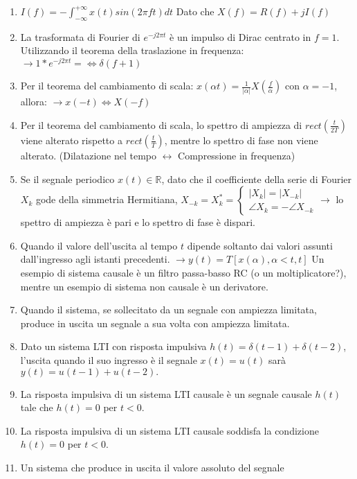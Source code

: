 \documentclass[
  paper=a4,
  ,captions=tableheading
]{scrartcl}
\begin{document}
\begin{enumerate}
\item
  \(\displaystyle I(f) =- \int_{- \infty}^{+\infty} x(t) sin(2\pi ft)dt\)
  Dato che \(\displaystyle X(f) = R(f)+ jI(f)\)
\item
  La trasformata di Fourier di \(e^{-j2\pi t}\) è un impulso di Dirac
  centrato in \(f = 1\). Utilizzando il teorema della traslazione in
  frequenza: \(\to 1*e^{-j2 \pi t} =\Leftrightarrow \delta (f+1)\)
\item
  Per il teorema del cambiamento di scala:
  \(\displaystyle x(\alpha t) = \frac{1}{|\alpha|} X(\frac{f}{\alpha})\)
  con \(\alpha = -1\), allora: \(\to x(-t) \Leftrightarrow X(-f)\)
\item
  Per il teorema del cambiamento di scala, lo spettro di ampiezza di
  \(rect(\frac{t}{2T})\) viene alterato rispetto a
  \(rect(\frac{t}{T})\), mentre lo spettro di fase non viene alterato.
  (Dilatazione nel tempo \(\leftrightarrow\) Compressione in frequenza)
\item
  Se il segnale periodico \(x(t) \in \mathbb{R}\), dato che il
  coefficiente della serie di Fourier \(X_k\) gode della simmetria
  Hermitiana,
  \(X_{-k} =X_k^* = \begin{cases} |X_k| =|X_{-k}| \\ \angle X_k = - \angle X_{-k} \end{cases} \to\)
  lo spettro di ampiezza è pari e lo spettro di fase è dispari.
\item
  Quando il valore dell'uscita al tempo \(t\) dipende soltanto dai
  valori assunti dall'ingresso agli istanti precedenti.
  \(\to y(t) = T[x(\alpha), \alpha < t, t]\) Un esempio di sistema
  causale è un filtro passa-basso RC (o un moltiplicatore?), mentre un
  esempio di sistema non causale è un derivatore.
\item
  Quando il sistema, se sollecitato da un segnale con ampiezza limitata,
  produce in uscita un segnale a sua volta con ampiezza limitata.
\item
  Dato un sistema LTI con risposta impulsiva
  \(h(t) = \delta(t - 1) + \delta(t - 2)\), l'uscita quando il suo
  ingresso è il segnale \(x(t) = u(t)\) sarà
  \(y(t) = u(t - 1) + u(t - 2).\)
\item
  La risposta impulsiva di un sistema LTI causale è un segnale causale
  \(h(t)\) tale che \(h(t) = 0\) per \(t < 0\).
\item
  La risposta impulsiva di un sistema LTI causale soddisfa la condizione
  \(h(t) = 0\) per \(t < 0\).
\item
  Un sistema che produce in uscita il valore assoluto del segnale

\end{enumerate}
\end{document}
